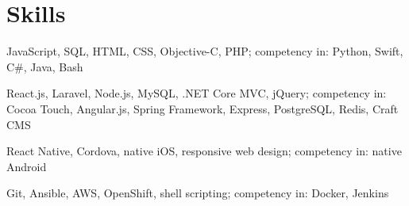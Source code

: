 {\begin{minipage}[t]{\rightcolwidth}
    \section*{Skills}

    \begin{description}[style=nextline,leftmargin=0pt]
        \item[Languages]
            JavaScript, SQL, HTML, CSS, Objective-C, PHP; competency in: Python, Swift, C\#, Java, Bash

        \item[Frameworks]
            React.js, Laravel, Node.js, MySQL, .NET Core MVC, jQuery;
            competency in: Cocoa Touch, Angular.js, Spring Framework, Express, PostgreSQL, Redis, Craft CMS

        \item[Mobile]
            React Native, Cordova, native iOS, responsive web design; competency in: native Android

        \item[Workflow]
            Git, Ansible, AWS, OpenShift, shell scripting; competency in: Docker, Jenkins
    \end{description}

\end{minipage}
}